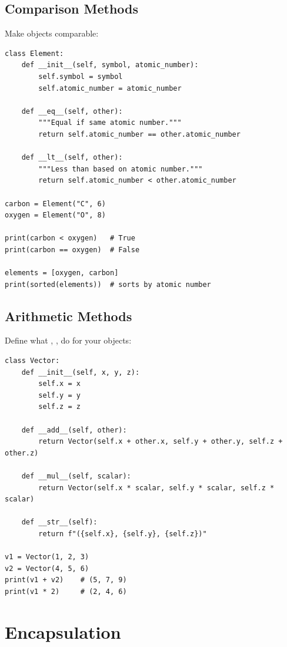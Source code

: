 \subsection{Comparison Methods}

Make objects comparable:

\begin{lstlisting}
class Element:
    def __init__(self, symbol, atomic_number):
        self.symbol = symbol
        self.atomic_number = atomic_number

    def __eq__(self, other):
        """Equal if same atomic number."""
        return self.atomic_number == other.atomic_number

    def __lt__(self, other):
        """Less than based on atomic number."""
        return self.atomic_number < other.atomic_number

carbon = Element("C", 6)
oxygen = Element("O", 8)

print(carbon < oxygen)   # True
print(carbon == oxygen)  # False

elements = [oxygen, carbon]
print(sorted(elements))  # sorts by atomic number
\end{lstlisting}

\subsection{Arithmetic Methods}

Define what \py{+}, \py{-}, \py{*} do for your objects:

\begin{lstlisting}
class Vector:
    def __init__(self, x, y, z):
        self.x = x
        self.y = y
        self.z = z

    def __add__(self, other):
        return Vector(self.x + other.x, self.y + other.y, self.z + other.z)

    def __mul__(self, scalar):
        return Vector(self.x * scalar, self.y * scalar, self.z * scalar)

    def __str__(self):
        return f"({self.x}, {self.y}, {self.z})"

v1 = Vector(1, 2, 3)
v2 = Vector(4, 5, 6)
print(v1 + v2)    # (5, 7, 9)
print(v1 * 2)     # (2, 4, 6)
\end{lstlisting}

\section{Encapsulation}
\label{sec:encapsulation}

